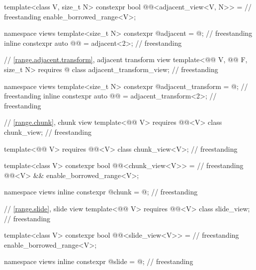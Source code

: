 \begin{codeblock}
{  template<class V, size_t N>
    constexpr bool @@<adjacent_view<V, N>> =                     // freestanding
      enable_borrowed_range<V>;

  namespace views {
    template<size_t N>
      constexpr @\unspecnc@ adjacent = @\unspecnc@;                                 // freestanding
    inline constexpr auto @@ = adjacent<2>;                                   // freestanding
  }

  // \ref{range.adjacent.transform}, adjacent transform view
  template<@@ V, @@ F, size_t N>
    requires @\seebelow@
  class adjacent_transform_view;                                                    // freestanding

  namespace views {
    template<size_t N>
      constexpr @\unspecnc@ adjacent_transform = @\unspecnc@;                       // freestanding
    inline constexpr auto @@ = adjacent_transform<2>;               // freestanding
  }

  // \ref{range.chunk}, chunk view
  template<@@ V>
    requires @@<V>
  class chunk_view;                                                                 // freestanding

  template<@@ V>
    requires @@<V>
  class chunk_view<V>;                                                              // freestanding

  template<class V>
    constexpr bool @@<chunk_view<V>> =                           // freestanding
      @@<V> && enable_borrowed_range<V>;

  namespace views { inline constexpr @\unspecnc@ chunk = @\unspecnc@; }             // freestanding

  // \ref{range.slide}, slide view
  template<@@ V>
    requires @@<V>
  class slide_view;                                                                 // freestanding

  template<class V>
    constexpr bool @@<slide_view<V>> =                           // freestanding
      enable_borrowed_range<V>;

  namespace views { inline constexpr @\unspecnc@ slide = @\unspecnc@; }             // freestanding

}
\end{codeblock}
